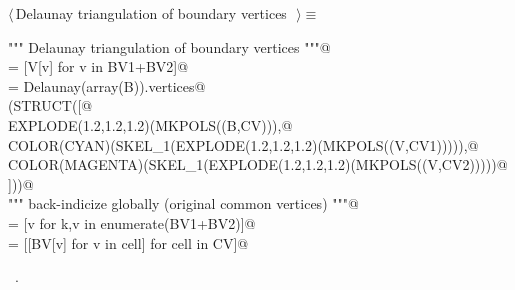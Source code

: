 \documentclass[11pt,oneside]{article}	%
\begin{document}
\begin{flushleft} \small \label{scrap13}
$\langle\,$Delaunay triangulation of boundary vertices\nobreak\ {\footnotesize {}}$\,\rangle\equiv$
\vspace{-1ex}
\begin{list}{}{} \item
\mbox{}\verb@""" Delaunay triangulation of boundary vertices """@\\
\mbox{}\verb@B = [V[v] for v in BV1+BV2]@\\
\mbox{}\verb@CV = Delaunay(array(B)).vertices@\\
\mbox{}\verb@VIEW(STRUCT([@\\
\mbox{}\verb@   EXPLODE(1.2,1.2,1.2)(MKPOLS((B,CV))),@\\
\mbox{}\verb@   COLOR(CYAN)(SKEL_1(EXPLODE(1.2,1.2,1.2)(MKPOLS((V,CV1))))),@\\
\mbox{}\verb@   COLOR(MAGENTA)(SKEL_1(EXPLODE(1.2,1.2,1.2)(MKPOLS((V,CV2)))))@\\
\mbox{}\verb@]))@\\
\mbox{}\verb@""" back-indicize globally (original common vertices) """@\\
\mbox{}\verb@BV = [v for k,v in enumerate(BV1+BV2)]@\\
\mbox{}\verb@CV = [[BV[v] for v in cell] for cell in CV]@\\
\mbox{}\verb@@{\NWsep}
\end{list}
\vspace{-1ex}
\footnotesize\addtolength{\baselineskip}{-1ex}
\begin{list}{}{\setlength{\itemsep}{-\parsep}\setlength{\itemindent}{-\leftmargin}}
\item \NWtxtMacroRefIn\ .
\end{list}
\end{flushleft}
\end{document}
